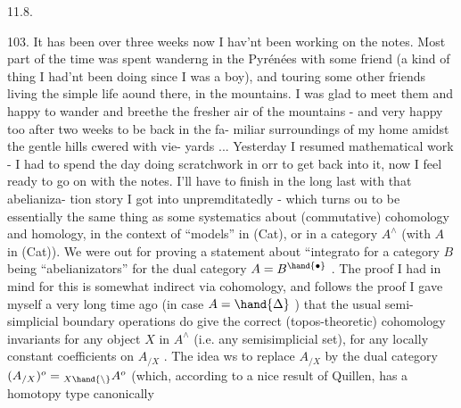 
11.8.

103. It has been over three weeks now I hav'nt been working on the notes.
Most part of the time was spent wanderng in the Pyrénées with some friend
(a kind of thing I had'nt been doing since I was a boy), and touring some
other friends living the simple life aound there, in the mountains. I was
glad to meet them and  happy to wander and breethe the fresher air of
the mountains - and very happy too after two weeks to be back in the fa-%
miliar surroundings of my home amidst the gentle hills cwered with vie-%
yards ... Yesterday I resumed mathematical work - I had to spend the day
doing scratchwork in orr to get back into it, now I feel ready to go on
with the notes. I'll have to finish in the long last with that abelianiza-%
tion story I got into unpremditatedly - which turns ou to be essentially
the same thing as some systematics about (commutative) cohomology and
homology, in the context of ``models'' in (Cat), or in a category $A^\wedge$
(with $A$ in (Cat)). We were out for proving a statement about ``integrato
for a  category $B$ being ``abelianizators'' for the dual category  $A=B^{\hand{\bullet}}$ .
The proof I had in mind for this  is somewhat indirect via cohomology,
and follows the proof I gave myself a very long time ago (in case $A=\hand{\Delta}$ )\hand{,}
that the usual semi-simplicial boundary operations do give the correct
(topos-theoretic) cohomology invariants for any object $X$ in $A^\wedge$ (i.e. any
semisimplicial set), for any locally constant coefficients on $A_{/X}$ .
The idea ws to replace $A_{/X}$ by the dual category $(A_{/X})^{o} = {}_{X\hand{\backslash}}A^{o}$ (which,
according to a nice result of Quillen, has a homotopy type canonically

